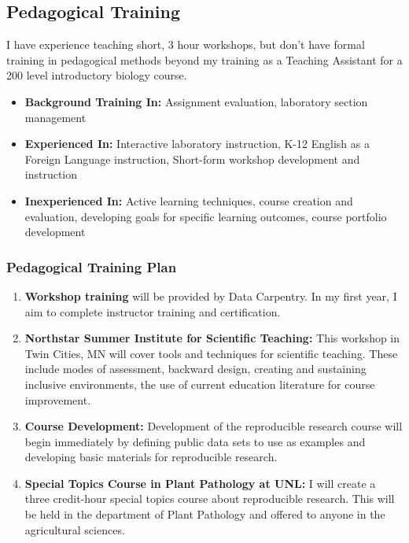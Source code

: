 \documentclass[12pt,letterpaper]{article}
\begin{document}
\subsection{Pedagogical Training}

I have experience teaching short, 3 hour workshops, but don't have formal training in pedagogical methods beyond my training as a Teaching Assistant for a 200 level introductory biology course. 

\begin{itemize}
  \item \textbf{Background Training In:} Assignment evaluation, laboratory section management
  \item \textbf{Experienced In:} Interactive laboratory instruction, K-12 English as a Foreign Language instruction, Short-form workshop development and
  instruction
  \item \textbf{Inexperienced In:} Active learning techniques, course creation and evaluation, developing goals for specific learning outcomes, course portfolio development
\end{itemize}

\subsubsection{Pedagogical Training Plan}

\begin{enumerate}
  \item \textbf{Workshop training} will be provided by Data Carpentry. In my first year, I aim to complete instructor training and certification.
  \item \textbf{Northstar Summer Institute for Scientific Teaching:} This workshop in Twin Cities, MN will cover tools and techniques for scientific teaching. These include modes of assessment, backward design, creating and sustaining inclusive environments, the use of current education literature for course improvement.
  \item \textbf{Course Development:} Development of the reproducible research course will begin immediately by defining public data sets to use as examples and developing basic materials for reproducible research.
  \item \textbf{Special Topics Course in Plant Pathology at UNL:} I will create a three credit-hour special topics course about reproducible research. This will be held in the department of Plant Pathology and offered to anyone in the agricultural sciences. 
\end{enumerate}
\end{document}
